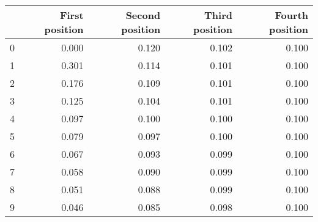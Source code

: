 \begin{tabular}{lrrrr}
\toprule
{} &  First position &  Second position &  Third position &  Fourth position \\
\midrule
0 &           0.000 &            0.120 &           0.102 &            0.100 \\
1 &           0.301 &            0.114 &           0.101 &            0.100 \\
2 &           0.176 &            0.109 &           0.101 &            0.100 \\
3 &           0.125 &            0.104 &           0.101 &            0.100 \\
4 &           0.097 &            0.100 &           0.100 &            0.100 \\
5 &           0.079 &            0.097 &           0.100 &            0.100 \\
6 &           0.067 &            0.093 &           0.099 &            0.100 \\
7 &           0.058 &            0.090 &           0.099 &            0.100 \\
8 &           0.051 &            0.088 &           0.099 &            0.100 \\
9 &           0.046 &            0.085 &           0.098 &            0.100 \\
\bottomrule
\end{tabular}
